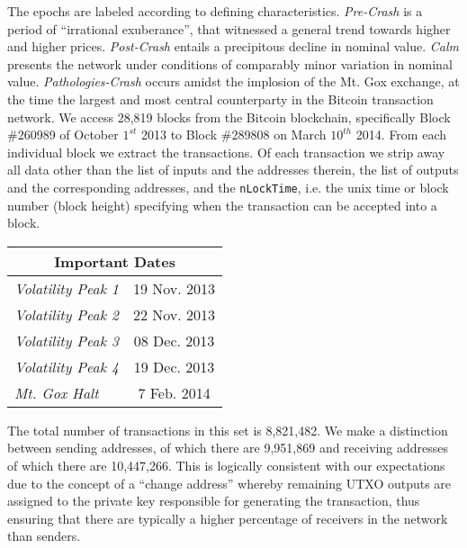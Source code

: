 The epochs are labeled according to defining characteristics. \textit{Pre-Crash} is a period of ``irrational exuberance'', that witnessed a general trend towards higher and higher prices. \textit{Post-Crash} entails a precipitous decline in nominal value. \textit{Calm} presents the network under conditions of comparably minor variation in nominal value. \textit{Pathologies-Crash} occurs amidst the implosion of the Mt. Gox exchange, at the time the largest and most central counterparty in the Bitcoin transaction network. We access 28,819 blocks from the Bitcoin blockchain, specifically Block \\ \#260989 of October $1^{st}$ 2013 to Block \#289808 on March $10^{th}$ 2014. From each individual block we extract the transactions. Of each transaction we strip away all data other than the list of inputs and the addresses therein, the list of outputs and the corresponding addresses, and the \texttt{nLockTime}, i.e. the unix time or block number (block height) specifying when the transaction can be accepted into a block. 


\begin{table}
\centering
\label{dates}
\begin{tabular}{|l|c|}
\hline
\multicolumn{2}{|c|}{\textbf{Important Dates}} \\ \hline
\textit{Volatility Peak 1}    & 19 Nov. 2013   \\ \hline
\textit{Volatility Peak 2}    & 22 Nov. 2013   \\ \hline
\textit{Volatility Peak 3}    & 08 Dec. 2013   \\ \hline
\textit{Volatility Peak 4}    & 19 Dec. 2013   \\ \hline
\textit{Mt. Gox Halt}         & 7 Feb. 2014    \\ \hline
\end{tabular}
\end{table} 


The total number of transactions in this set is 8,821,482. We make a distinction between sending addresses, of which there are 9,951,869 and receiving addresses of which there are 10,447,266. This is logically consistent with our expectations due to the concept of a ``change address'' whereby remaining UTXO outputs are assigned to the private key responsible for generating the transaction, thus ensuring that there are typically a higher percentage of receivers in the network than senders. 


